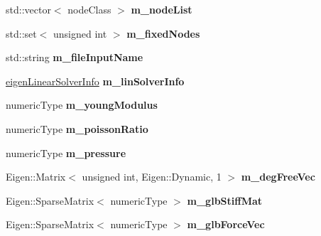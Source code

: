 \begin{DoxyCompactItemize}
std\+::vector$<$ node\+Class $>$ {\bfseries m\+\_\+node\+List}
\item 
\mbox{\label{classbase_structural_analysis_class_a037d04d00f755b1d9d95e880e5c09312}} 
std\+::set$<$ unsigned int $>$ {\bfseries m\+\_\+fixed\+Nodes}
\item 
\mbox{\label{classbase_structural_analysis_class_af71b3fd8032c8ac1e177ae6b97a91d1c}} 
std\+::string {\bfseries m\+\_\+file\+Input\+Name}
\item 
\mbox{\label{classbase_structural_analysis_class_a610e3e0a3be5e5daa43615f21675b63c}} 
\mbox{\hyperlink{classeigen_linear_solver_info}{eigen\+Linear\+Solver\+Info}} {\bfseries m\+\_\+lin\+Solver\+Info}
\item 
\mbox{\label{classbase_structural_analysis_class_a06dce5c9f7beb2873fe6c00c66e985a7}} 
numeric\+Type {\bfseries m\+\_\+young\+Modulus}
\item 
\mbox{\label{classbase_structural_analysis_class_adacc82b7726291dd9a0a2441863858b4}} 
numeric\+Type {\bfseries m\+\_\+poisson\+Ratio}
\item 
\mbox{\label{classbase_structural_analysis_class_aad6c2c8b50f5aeb0cd6aa9a3894656b3}} 
numeric\+Type {\bfseries m\+\_\+pressure}
\item 
\mbox{\label{classbase_structural_analysis_class_a30c9d240e183d6ed546127192b342086}} 
Eigen\+::\+Matrix$<$ unsigned int, Eigen\+::\+Dynamic, 1 $>$ {\bfseries m\+\_\+deg\+Free\+Vec}
\item 
\mbox{\label{classbase_structural_analysis_class_a32476178ae646ba8324440cc1d2efd11}} 
Eigen\+::\+Sparse\+Matrix$<$ numeric\+Type $>$ {\bfseries m\+\_\+glb\+Stiff\+Mat}
\item 
\mbox{\label{classbase_structural_analysis_class_ab6038cf67e12c8125b7b66437442b0b5}} 
Eigen\+::\+Sparse\+Matrix$<$ numeric\+Type $>$ {\bfseries m\+\_\+glb\+Force\+Vec}

\end{DoxyCompactItemize}
